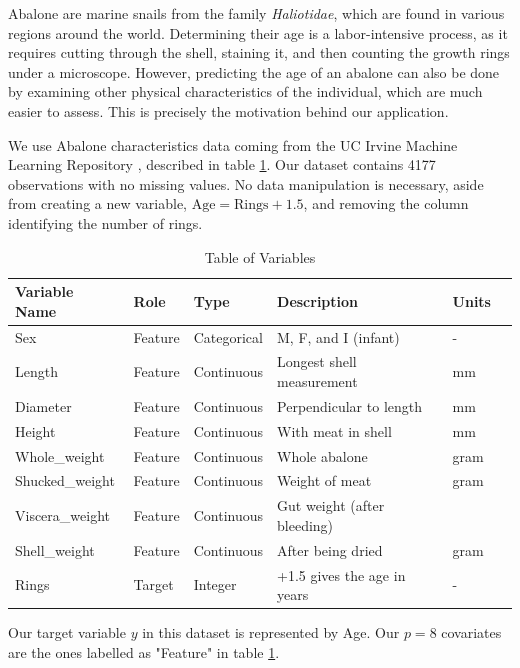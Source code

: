 \documentclass[a4paper,11pt]{article}
\begin{document}
Abalone are marine snails from the family \textit{Haliotidae}, which are found in various regions around the world. Determining their age is a labor-intensive process, as it requires cutting through the shell, staining it, and then counting the growth rings under a microscope. However, predicting the age of an abalone can also be done by examining other physical characteristics of the individual, which are much easier to assess. This is precisely the motivation behind our application.

We use Abalone characteristics data coming from the UC Irvine Machine Learning Repository \parencite{warwicknashAbalone1994a}, described in table \ref{table1}. Our dataset contains 4177 observations with no missing values. No data manipulation is necessary, aside from creating a new variable, \( \text{Age} = \text{Rings} + 1.5 \), and removing the column identifying the number of rings. 

\begin{table}[h]
  \centering
  \begin{tabular}{llllll}

  \toprule
  Variable Name & Role & Type & Description & Units \\
  \midrule
  Sex                  & Feature       & Categorical   & M, F, and I (infant) & -    \\
  Length               & Feature       & Continuous    & Longest shell measurement & mm\\
  Diameter             & Feature       & Continuous    & Perpendicular to length & mm  \\
  Height               & Feature       & Continuous    & With meat in shell      & mm  \\
  Whole\_weight         & Feature       & Continuous    & Whole abalone           & gram\\
  Shucked\_weight       & Feature       & Continuous    & Weight of meat          & gram\\
  Viscera\_weight       & Feature       & Continuous    & Gut weight (after bleeding) & \\
  Shell\_weight         & Feature       & Continuous    & After being dried       & gram\\
  Rings                & Target        & Integer       & +1.5 gives the age in years & - \\

   \bottomrule
  \end{tabular}
  \caption{Table of Variables}
  \label{table1}
  \end{table}
Our target variable $y$ in this dataset is represented by Age. Our $p = 8$ covariates are the ones labelled as "Feature" in table \ref{table1}.
\end{document}
